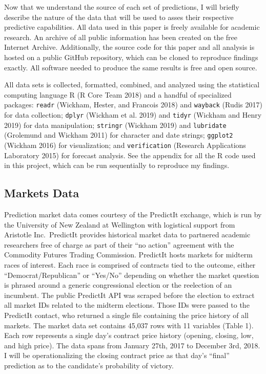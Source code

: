 \documentclass[11pt,]{article}
\begin{document}
Now that we understand the source of each set of predictions, I will
briefly describe the nature of the data that will be used to asses their
respective predictive capabilities. All data used in this paper is
freely available for academic research. An archive of all public
information has been created on the free Internet Archive. Additionally,
the source code for this paper and all analysis is hosted on a public
GitHub repository, which can be cloned to reproduce findings exactly.
All software needed to produce the same results is free and open source.

All data sets is collected, formatted, combined, and analyzed using the
statistical computing language R (R Core Team 2018) and a handful of
specialized packages: \texttt{readr} (Wickham, Hester, and Francois
2018) and \texttt{wayback} (Rudis 2017) for data collection;
\texttt{dplyr} (Wickham et al. 2019) and \texttt{tidyr} (Wickham and
Henry 2019) for data manipulation; \texttt{stringr} (Wickham 2019) and
\texttt{lubridate} (Grolemund and Wickham 2011) for character and date
strings; \texttt{ggplot2} (Wickham 2016) for visualization; and
\texttt{verification} (Research Applications Laboratory 2015) for
forecast analysis. See the appendix for all the R code used in this
project, which can be run sequentially to reproduce my findings.

\hypertarget{markets-data}{%
\subsection{Markets Data}\label{markets-data}}

Prediction market data comes courtesy of the PredictIt exchange, which
is run by the University of New Zealand at Wellington with logistical
support from Aristotle Inc.~PredictIt provides historical market data to
partnered academic researchers free of charge as part of their ``no
action'' agreement with the Commodity Futures Trading Commission.
PredictIt hosts markets for midterm races of interest. Each race is
comprised of contracts tied to the outcome, either
``Democrat/Republican'' or ``Yes/No'' depending on whether the market
question is phrased around a generic congressional election or the
reelection of an incumbent. The public PredictIt API was scraped before
the election to extract all market IDs related to the midterm elections.
Those IDs were passed to the PredictIt contact, who returned a single
file containing the price history of all markets. The market data set
contains 45,037 rows with 11 variables (Table 1). Each row represents a
single day's contract price history (opening, closing, low, and high
price). The data spans from January 27th, 2017 to December 3rd, 2018. I
will be operationalizing the closing contract price as that day's
``final'' prediction as to the candidate's probability of victory.
\end{document}
